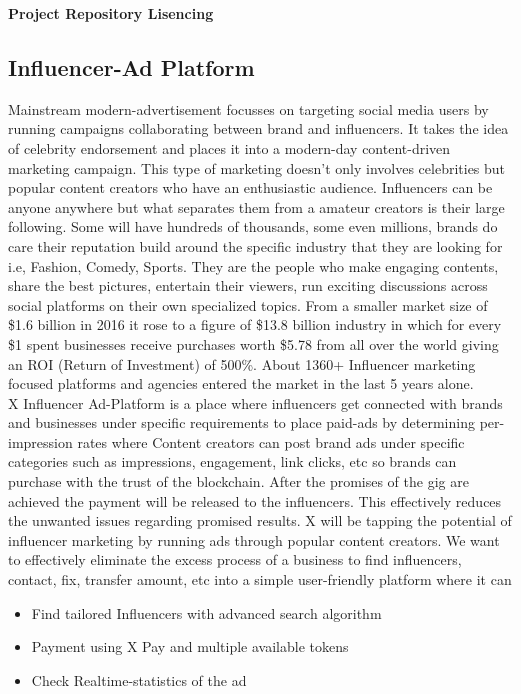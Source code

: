 \documentclass[letterpaper,11pt]{article}
\begin{document}
\textbf{Project Repository Lisencing}\\

\subsection{\textbf{Influencer-Ad Platform}}

Mainstream modern-advertisement focusses on targeting social media users by running campaigns collaborating between brand and influencers. It takes the idea of celebrity endorsement and places it into a modern-day content-driven marketing campaign. This type of marketing doesn't only involves celebrities but popular content creators who have an enthusiastic audience. Influencers can be anyone anywhere but what separates them from a amateur creators is their large following. Some will have hundreds of thousands, some even millions, brands do care their reputation build around the specific industry that they are looking for i.e, Fashion, Comedy, Sports. They are the people who make engaging contents, share the best pictures, entertain their viewers, run exciting discussions across social platforms on their own specialized topics. From a smaller market size of \$1.6 billion in 2016 it rose to a figure of \$13.8 billion industry in which for every \$1 spent businesses receive purchases worth \$5.78 from all over the world giving an ROI (Return of Investment) of 500\%. About 1360+ Influencer marketing focused platforms and agencies entered the market in the last 5 years alone.\\

X Influencer Ad-Platform is a place where influencers get connected with brands and businesses under specific requirements to place paid-ads by determining per-impression rates where Content creators can post brand ads under specific categories such as impressions, engagement, link clicks, etc so brands can purchase with the trust of the blockchain. After the promises of the gig are achieved the payment will be released to the influencers. This effectively reduces the unwanted issues regarding promised results. X will be tapping the potential of influencer marketing by running ads through popular content creators. We want to effectively eliminate the excess process of a business to find influencers, contact, fix, transfer amount, etc into a simple user-friendly platform where it can
\begin{itemize}[wide, labelwidth=!, labelindent=0pt]
\item Find tailored Influencers with advanced search algorithm
\item Payment using X Pay and multiple available tokens
\item Check Realtime-statistics of the ad
\end{itemize}
\end{document}
